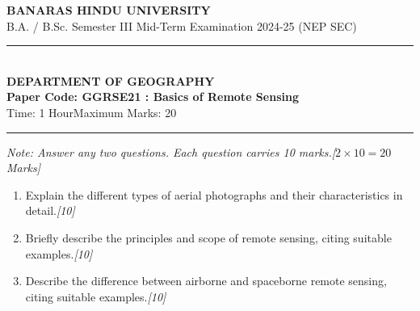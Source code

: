\documentclass[11pt,a4paper]{article}
\newcommand{\pts}[1]{\hfill   \textit{[#1]}}
\begin{document}
\begin{center}
  {\large\bfseries BANARAS HINDU UNIVERSITY}\\[2pt]
  {\normalsize B.A. / B.Sc. Semester III Mid-Term Examination 2024-25 (NEP SEC)}\\[6pt]
  \rule{0.8\linewidth}{0.5pt}\\[6pt]
  {\large\bfseries DEPARTMENT OF GEOGRAPHY}\\[4pt]
  {\large\bfseries Paper Code: GGRSE21 : Basics of Remote Sensing}\\[4pt]
  {\normalsize Time: 1 Hour\hfill Maximum Marks: 20}
\end{center}

\rule{\linewidth}{0.4pt}

\smallskip



\noindent   \textit{Note: Answer any two questions. Each question carries 10 marks.\hfill [$2  \times 10 = 20$ Marks]}

\bigskip


\begin{enumerate}[label=   \textbf{Q\arabic*.}]
    \item Explain the different types of aerial photographs and their characteristics in detail.\pts{10}
    \item Briefly describe the principles and scope of remote sensing, citing suitable examples.\pts{10}
    \item Describe the difference between airborne and spaceborne remote sensing, citing suitable examples.\pts{10}
\end{enumerate}
\end{document}
